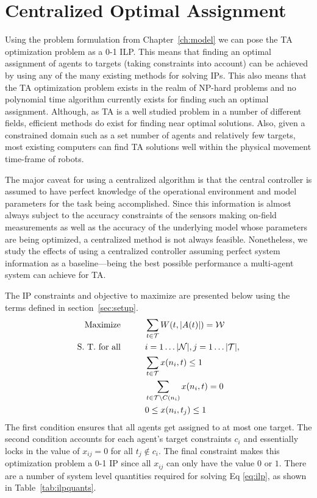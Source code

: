 \documentclass[defaultstyle,12pt]{thesis}
\newcommand{\Pl}{\mathcal{N}} %
\newcommand{\Ta}{\mathcal{T}} %
\newcommand{\We}{\mathcal{W}} %
\begin{document}
\section{Centralized Optimal Assignment}
Using the problem formulation from Chapter~\ref{ch:model} we can pose the TA optimization problem as a 0-1 ILP. This means that finding an optimal assignment of agents to targets (taking constraints into account) can be achieved by using any of the many existing methods for solving IPs. This also means that the TA optimization problem exists in the realm of NP-hard problems and no polynomial time algorithm currently exists for finding such an optimal assignment. Although, as TA is a well studied problem in a number of different fields, efficient methods do exist for finding near optimal solutions. Also, given a constrained domain such as a set number of agents and relatively few targets, most existing computers can find TA solutions well within the physical movement time-frame of robots. 

The major caveat for using a centralized algorithm is that the central controller is assumed to have perfect knowledge of the operational environment and model parameters for the task being accomplished. Since this information is almost always subject to the accuracy constraints of the sensors making on-field measurements as well as the accuracy of the underlying model whose parameters are being optimized, a centralized method is not always feasible. Nonetheless, we study the effects of using a centralized controller assuming perfect system information as a baseline---being the best possible performance a multi-agent system can achieve for TA.

The IP constraints and objective to maximize are presented below using the terms defined in section~\ref{sec:setup}. 
\begin{align}\label{eq:ilp}
	\text{Maximize}\hspace{1cm} & \sum\limits_{t \in \Ta} W(t, |A(t)|) = \We\\
	\text{S. T. for all}\hspace{1cm} & i = 1\ldots|\Pl|, j = 1\ldots|\Ta|,\notag\\
	& \sum\limits_{t \in \Ta} x(n_i, t) \leq 1\notag\\
	& \sum\limits_{t \in \Ta \backslash C(n_i)} x(n_i, t) = 0\notag\\
	& 0 \leq x(n_i, t_j) \leq 1\notag
\end{align}
The first condition ensures that all agents get assigned to at most one target. The second condition accounts for each agent's target constraints $c_i$ and essentially locks in the value of $x_{ij} = 0$ for all $t_j \not\in c_i$. The final constraint makes this optimization problem a 0-1 IP since all $x_{ij}$ can only have the value $0$ or $1$. There are a number of system level quantities required for solving Eq \eqref{eq:ilp}, as shown in Table~\ref{tab:ilpquants}.
\end{document}
